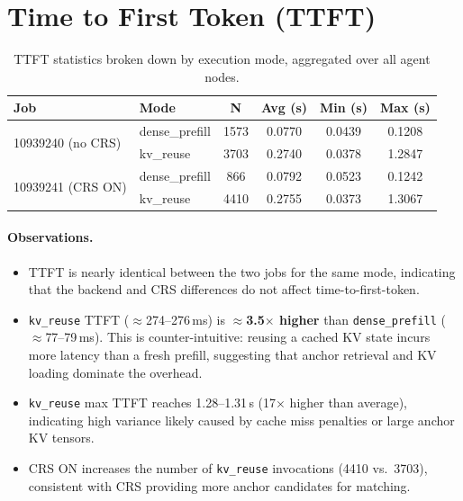 \documentclass[11pt]{article}
\begin{document}
\section{Time to First Token (TTFT)}

\begin{table}[h]
\centering
\caption{TTFT statistics broken down by execution mode, aggregated over all
         agent nodes.}
\label{tab:ttft}
\begin{tabular}{llcccc}
\toprule
\textbf{Job} & \textbf{Mode} & \textbf{N} & \textbf{Avg (s)} & \textbf{Min (s)} & \textbf{Max (s)} \\
\midrule
\multirow{2}{*}{10939240 (no CRS)} & dense\_prefill & 1573 & 0.0770 & 0.0439 & 0.1208 \\
                                   & kv\_reuse      & 3703 & 0.2740 & 0.0378 & 1.2847 \\
\midrule
\multirow{2}{*}{10939241 (CRS ON)} & dense\_prefill &  866 & 0.0792 & 0.0523 & 0.1242 \\
                                   & kv\_reuse      & 4410 & 0.2755 & 0.0373 & 1.3067 \\
\bottomrule
\end{tabular}
\end{table}

\paragraph{Observations.}
\begin{itemize}
  \item TTFT is nearly identical between the two jobs for the same mode,
        indicating that the backend and CRS differences do not affect
        time-to-first-token.
  \item \texttt{kv\_reuse} TTFT ($\approx$274--276\,ms) is \textbf{$\approx$3.5$\times$
        higher} than \texttt{dense\_prefill} ($\approx$77--79\,ms).  This is
        counter-intuitive: reusing a cached KV state incurs more latency than a
        fresh prefill, suggesting that anchor retrieval and KV loading dominate
        the overhead.
  \item \texttt{kv\_reuse} max TTFT reaches 1.28--1.31\,s (17$\times$ higher
        than average), indicating high variance likely caused by cache miss
        penalties or large anchor KV tensors.
  \item CRS ON increases the number of \texttt{kv\_reuse} invocations
        (4410 vs.\ 3703), consistent with CRS providing more anchor candidates
        for matching.
\end{itemize}
\end{document}
